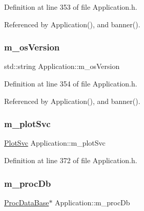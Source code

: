 Definition at line 353 of file Application.\+h.



Referenced by Application(), and banner().

\mbox{\label{classApplication_a17949f767d2598e92acb0885bb399dc0}} 
\subsubsection{\texorpdfstring{m\+\_\+os\+Version}{m\_osVersion}}
{\footnotesize\ttfamily std\+::string Application\+::m\+\_\+os\+Version\hspace{0.3cm}{\ttfamily [protected]}}



Definition at line 354 of file Application.\+h.



Referenced by Application(), and banner().

\mbox{\label{classApplication_a30d5600ea5e4f36b14f25f903ee3256e}} 
\subsubsection{\texorpdfstring{m\+\_\+plot\+Svc}{m\_plotSvc}}
{\footnotesize\ttfamily \hyperlink{Application_8h_abaa10d33ca2837dfcf8ba9bff40cdbb6}{Plot\+Svc} Application\+::m\+\_\+plot\+Svc\hspace{0.3cm}{\ttfamily [private]}}



Definition at line 372 of file Application.\+h.

\mbox{\label{classApplication_af030cefeb69586f01e965606d5dd8919}} 
\subsubsection{\texorpdfstring{m\+\_\+proc\+Db}{m\_procDb}}
{\footnotesize\ttfamily \hyperlink{classProcDataBase}{Proc\+Data\+Base}$\ast$ Application\+::m\+\_\+proc\+Db\hspace{0.3cm}{\ttfamily [private]}}



